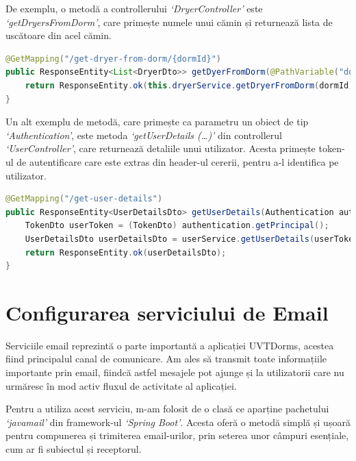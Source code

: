 \documentclass[12pt,a4paper]{report}
\theoremstyle{definition}
\theoremstyle{remark}
\begin{document}
\par De exemplu, o metodă a controllerului \textit{`DryerController'} este \textit{`getDryersFromDorm'}, care primește numele unui cămin și returnează lista de uscătoare din acel cămin.

\begin{lstlisting}[language=Java, caption={Metoda getDryersFromDorm}]
@GetMapping("/get-dryer-from-dorm/{dormId}")
public ResponseEntity<List<DryerDto>> getDyerFromDorm(@PathVariable("dormId") String dormId) {
    return ResponseEntity.ok(this.dryerService.getDryerFromDorm(dormId));
}
\end{lstlisting}

\par Un alt exemplu de metodă, care primește ca parametru un obiect de tip \textit{`Authentication'}, este metoda \textit{`getUserDetails (\ldots)'} din controllerul \textit{`UserController'}, care returnează detaliile unui utilizator. Acesta primește token-ul de autentificare care este extras din header-ul cererii, pentru a-l identifica pe utilizator.

\begin{lstlisting}[language=Java, caption={Metoda getUserDetails(...)}]
@GetMapping("/get-user-details")
public ResponseEntity<UserDetailsDto> getUserDetails(Authentication authentication) {
    TokenDto userToken = (TokenDto) authentication.getPrincipal();
    UserDetailsDto userDetailsDto = userService.getUserDetails(userToken.getEmail());
    return ResponseEntity.ok(userDetailsDto);
}
\end{lstlisting}

\section{Configurarea serviciului de Email}

\par Serviciile email reprezintă o parte importantă a aplicației UVTDorms, acestea fiind principalul canal de comunicare. Am ales să transmit toate informațiile importante prin email, fiindcă astfel mesajele pot ajunge și la utilizatorii care nu urmăresc în mod activ fluxul de activitate al aplicației.

\par Pentru a utiliza acest serviciu, m-am folosit de o clasă ce aparține pachetului \textit{`javamail'} din framework-ul \textit{`Spring Boot'}. Acesta oferă o metodă simplă și ușoară pentru compunerea și trimiterea email-urilor, prin seterea unor câmpuri esențiale, cum ar fi subiectul și receptorul\cite{guide_to_spring_email}.
\end{document}
